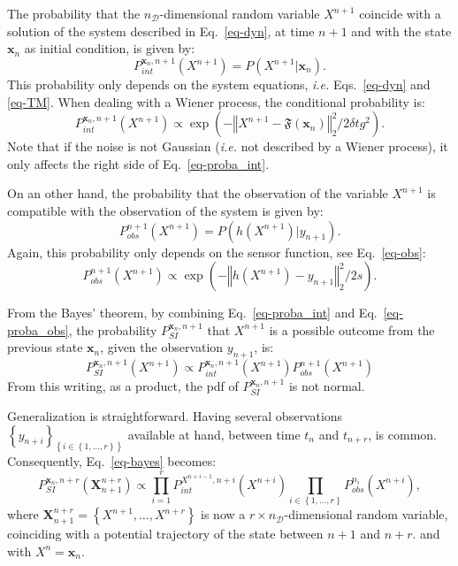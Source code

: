 \documentclass[aip,pof,nofootinbib,reprint,onecolumn]{revtex4-1}
\newcommand{\gras}[1]{\boldsymbol{#1}}
\newcommand{\mypar}[1]{\left(#1\right)}
\newcommand{\mya}[1]{\left\{#1\right\}}
\newcommand{\norme}[1]{\left\Vert #1\right\Vert_2}
\newcommand{\Nphaz}{n_{\mathcal{D}}} %
\newcommand{\fint}{\mathfrak{F}} %
\newcommand{\obs}{y} %
\newcommand{\point}{\gras{x}} %
\newcommand{\rpoint}{X}
\begin{document}
The probability that the $\Nphaz$-dimensional random variable $\rpoint^{n+1}$ coincide with a solution of the system described in Eq.~\eqref{eq-dyn}, at time $n+1$ and with the state $\point_{n}$ as initial condition, is given by:
$$P^{\point_n,n+1}_{int}\mypar{\rpoint^{n+1}} = P\mypar{\rpoint^{n+1}|\point_n}.$$ 
This probability only depends on the system equations, \emph{i.e.} Eqs.~\eqref{eq-dyn} and \eqref{eq-TM}. When dealing with a Wiener process, the conditional probability is:
\begin{equation}
P^{\point_n,n+1}_{int}\mypar{\rpoint^{n+1}} \propto \exp \mypar{- \norme{\rpoint^{n+1} - \fint\mypar{\point_n}}^2/2\delta t g^2}.
\label{eq-proba_int}
\end{equation}
Note that if the noise is not Gaussian (\emph{i.e.} not described by a Wiener process), it only affects the right side of Eq.~\eqref{eq-proba_int}.

On an other hand, the probability that the observation of the variable $\rpoint^{n+1}$ is compatible with the observation of the system is given by:
$$P^{n+1}_{obs}\mypar{\rpoint^{n+1}} = P\mypar{h\mypar{\rpoint^{n+1}}|\obs_{n+1}}.$$ 
Again, this probability only depends on the sensor function, see Eq.~\eqref{eq-obs}:
\begin{equation}
 P^{n+1}_{obs}\mypar{\rpoint^{n+1}}  \propto \exp \mypar{- \norme{h\mypar{\rpoint^{n+1}} - y_{n+1}}^2/2s}.
\label{eq-proba_obs}
\end{equation}

From the Bayes' theorem, by combining Eq.~\eqref{eq-proba_int} and Eq.~\eqref{eq-proba_obs}, the probability $P^{\point_n,n+1}_{SI}$ that $\rpoint^{n+1}$ is a possible outcome from the previous state $\point_n$, given the observation $\obs_{n+1}$, is:
\begin{equation}
P^{\point_n,n+1}_{SI}\mypar{\rpoint^{n+1}} \propto P^{\point_n,n+1}_{int}\mypar{\rpoint^{n+1}} P^{n+1}_{obs}\mypar{\rpoint^{n+1}}
\label{eq-bayes}
\end{equation}
From this writing, as a product, the pdf of $P^{\point_n,n+1}_{SI}$ is not normal.

Generalization is straightforward. 
Having several observations $\mya{\obs_{n+i}}_{\mya{i\in \mya{1,\hdots,r}}}$ available at hand, between time $t_n$ and $t_{n+r}$, is common. 
Consequently,  Eq.~\eqref{eq-bayes} becomes:
\begin{equation}
P^{\point_n,n+r}_{SI}\mypar{\gras{\rpoint}_{n+1}^{n+r}} \propto \prod_{i=1}^r P^{\rpoint^{n+i-1},n+i}_{int}\mypar{\rpoint^{n+i}} \prod_{i\in \mya{1,\hdots,r}} P^{n_i}_{obs}\mypar{\rpoint^{n+i}},
\label{eq-SI}
\end{equation}
where $\gras{\rpoint}_{n+1}^{n+r} = \mya{\rpoint^{n+1}, \hdots,\rpoint^{n+r}}$ is now a $r\times\Nphaz$-dimensional random variable, coinciding with a potential trajectory of the state between $n+1$ and ${n+r}$. and with $\rpoint^n = \point_n$.
\end{document}
